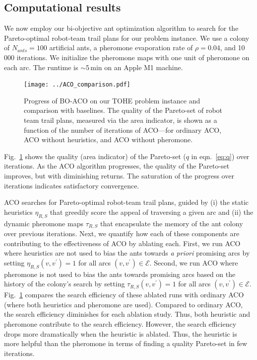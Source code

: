 \documentclass[11pt, oneside]{article}
\begin{document}
\subsection{Computational results}
We now employ our bi-objective ant optimization algorithm to search for the Pareto-optimal robot-team trail plans for our problem instance.
We use a colony of $N_{ants}=100$ artificial ants, a pheromone evaporation rate of $\rho=0.04$, and 10\,000 iterations. We initialize the pheromone maps with one unit of pheromone on each arc.
The runtime is $\sim$5\,min on an Apple M1 machine.

\begin{figure}[h!]
    \centering
    \texttt{[image: ../ACO\_comparison.pdf]}
    \caption{Progress of BO-ACO on our TOHE problem instance and comparison with baselines. 
    The quality of the Pareto-set of robot team trail plans, measured via the area indicator, is shown as a function of the number of iterations of ACO---for ordinary ACO, ACO without heuristics, and ACO without pheromone.
    } \label{fig:aco_progress}
\end{figure}

Fig.~\ref{fig:aco_progress} shows the quality (area indicator) of the Pareto-set ($q$ in eqn.~\ref{eq:q}) over iterations. As the ACO algorithm progresses, the quality of the Pareto-set improves, but with diminishing returns. The saturation of the progress over iterations indicates satisfactory convergence.

ACO searches for Pareto-optimal robot-team trail plans,
guided by (i) the static heuristics $\eta_{R,S}$ that greedily score the appeal of traversing a given arc and (ii) the dynamic pheromone maps $\tau_{R,S}$ that encapsulate the memory of the ant colony over previous iterations. 
Next, we quantify how each of these components are contributing to the effectiveness of ACO by ablating each. 
First, we run ACO where heuristics are not used to bias the ants towards \emph{a priori} promising arcs by setting $\eta_{R,S}(v, v^\prime)=1$ for all arcs $(v, v^\prime)\in \mathcal{E}$. Second, we run ACO where pheromone is not used to bias the ants towards promising arcs based on the history of the colony's search by setting $\tau_{R,S}(v, v^\prime)=1$ for all arcs $(v, v^\prime)\in \mathcal{E}$.
Fig.~\ref{fig:aco_progress} compares the search efficiency of these ablated runs with ordinary ACO (where both heuristics and pheromone are used).
Compared to ordinary ACO, the search efficiency diminishes for each ablation study. 
Thus, both heuristic and pheromone contribute to the search efficiency.
However, the search efficiency drops more dramatically when the heuristic is ablated. 
Thus, the heuristic is more helpful than the pheromone in terms of finding a quality Pareto-set in few iterations. 
\end{document}
